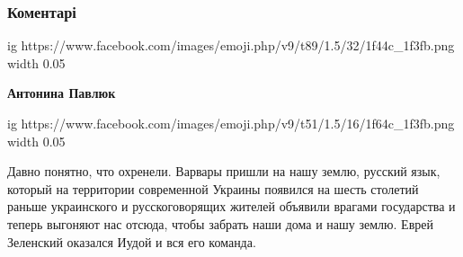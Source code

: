  
 
 
 
 
\subsubsection{Коментарі}


\begin{itemize}


\ifcmt
  ig https://www.facebook.com/images/emoji.php/v9/t89/1.5/32/1f44c_1f3fb.png
  width 0.05
\fi

\begin{itemize}
 
\textbf{Антонина Павлюк} 

\ifcmt
  ig https://www.facebook.com/images/emoji.php/v9/t51/1.5/16/1f64c_1f3fb.png
  width 0.05
\fi

\end{itemize}

 

Давно понятно, что охренели. Варвары пришли на нашу землю, русский язык,
который на территории современной Украины появился на шесть столетий раньше
украинского и русскоговорящих жителей объявили врагами государства и теперь
выгоняют нас отсюда, чтобы забрать наши дома и нашу землю. Еврей Зеленский
оказался Иудой и вся его команда.

\begin{itemize}
 

\end{itemize}
\end{itemize}
